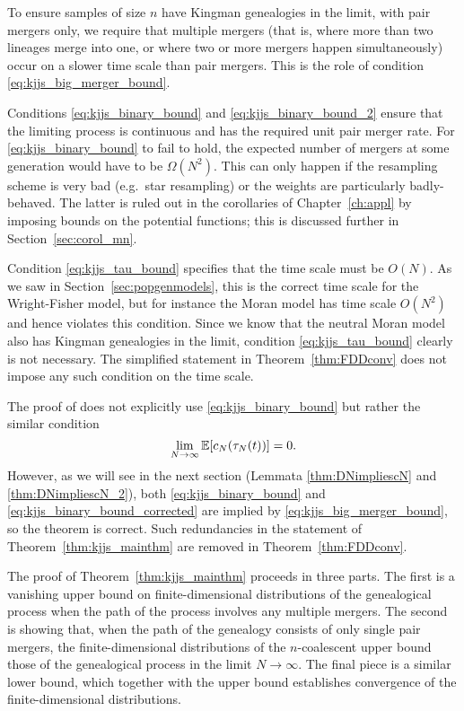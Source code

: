 To ensure samples of size $n$ have Kingman genealogies in the limit, with pair mergers only, we require that multiple mergers (that is, where more than two lineages merge into one, or where two or more mergers happen simultaneously) occur on a slower time scale than pair mergers. 
This is the role of condition \eqref{eq:kjjs_big_merger_bound}.

Conditions \eqref{eq:kjjs_binary_bound} and \eqref{eq:kjjs_binary_bound_2} ensure that the limiting process is continuous and has the required unit pair merger rate.
For \eqref{eq:kjjs_binary_bound} to fail to hold, the expected number of mergers at some generation would have to be $\Omega(N^2)$. This can only happen if the resampling scheme is very bad (e.g.\ star resampling) or the weights are particularly badly-behaved. The latter is ruled out in the corollaries of Chapter~\ref{ch:appl} by imposing bounds on the potential functions; this is discussed further in Section~\ref{sec:corol_mn}.

Condition \eqref{eq:kjjs_tau_bound} specifies that the time scale must be $O(N)$. As we saw in Section~\ref{sec:popgenmodels}, this is the correct time scale for the Wright-Fisher model, but for instance the Moran model has time scale $O(N^2)$ and hence violates this condition. 
Since we know that the neutral Moran model also has Kingman genealogies in the limit, condition \eqref{eq:kjjs_tau_bound} clearly is not necessary. 
The simplified statement in Theorem~\ref{thm:FDDconv} does not impose any such condition on the time scale.

The proof of \textcite{koskela2018} does not explicitly use \eqref{eq:kjjs_binary_bound} but rather the similar condition
\begin{equation}\label{eq:kjjs_binary_bound_corrected}
\lim_{ N \rightarrow \infty } \mathbb{E}[ c_N( \tau_N(t) ) ] = 0 .
\end{equation}
However, as we will see in the next section (Lemmata \ref{thm:DNimpliescN} and \ref{thm:DNimpliescN_2}), both \eqref{eq:kjjs_binary_bound} and \eqref{eq:kjjs_binary_bound_corrected} are implied by \eqref{eq:kjjs_big_merger_bound}, so the theorem is correct. 
Such redundancies in the statement of Theorem~\ref{thm:kjjs_mainthm} are removed in Theorem~\ref{thm:FDDconv}.


The proof of Theorem~\ref{thm:kjjs_mainthm} \parencite[i.e.][Theorem 1]{koskela2018} proceeds in three parts.
The first is a vanishing upper bound on finite-dimensional distributions of the genealogical process when the path of the process involves any multiple mergers.
The second is showing that, when the path of the genealogy consists of only single pair mergers, the finite-dimensional distributions of the $n$-coalescent upper bound those of the genealogical process in the limit $N\to\infty$.
The final piece is a similar lower bound, which together with the upper bound establishes convergence of the finite-dimensional distributions.




